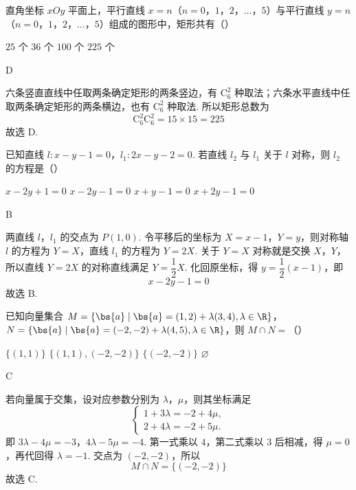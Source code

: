 \begin{problem}
直角坐标 \(xOy\) 平面上，平行直线 \(x=n\)（\(n=0\)，\(1\)，\(2\)，\(\ldots\)，\(5\)）与平行直线 \(y=n\)（\(n=0\)，\(1\)，\(2\)，\(\ldots\)，\(5\)）组成的图形中，矩形共有（\quad）

\choices
    {\(25\) 个}
    {\(36\) 个}
    {\(100\) 个}
    {\(225\) 个}
\end{problem}

\begin{answer}
D
\end{answer}

\begin{solution}
六条竖直直线中任取两条确定矩形的两条竖边，有 \(\mathrm C_6^2\) 种取法；六条水平直线中任取两条确定矩形的两条横边，也有 \(\mathrm C_6^2\) 种取法. 所以矩形总数为
\[
\mathrm C_6^2\mathrm C_6^2=15\times15=225
\]
故选 D.
\end{solution}

\begin{problem}
已知直线 \(l:x-y-1=0\)，\(l_1:2x-y-2=0\). 若直线 \(l_2\) 与 \(l_1\) 关于 \(l\) 对称，则 \(l_2\) 的方程是（\quad）

\choices
    {\(x-2y+1=0\)}
    {\(x-2y-1=0\)}
    {\(x+y-1=0\)}
    {\(x+2y-1=0\)}
\end{problem}

\begin{answer}
B
\end{answer}

\begin{solution}
两直线 \(l\)，\(l_1\) 的交点为 \(P(1,0)\). 令平移后的坐标为 \(X=x-1\)，\(Y=y\)，则对称轴 \(l\) 的方程为 \(Y=X\)，直线 \(l_1\) 的方程为 \(Y=2X\). 关于 \(Y=X\) 对称就是交换 \(X\)，\(Y\)，所以直线 \(Y=2X\) 的对称直线满足 \(Y=\dfrac12X\). 化回原坐标，得 \(y=\dfrac12(x-1)\)，即
\[
x-2y-1=0
\]
故选 B.
\end{solution}

\begin{problem}
已知向量集合 \(M=\{\bs{a}\mid \bs{a}=(1,2)+\lambda(3,4),\lambda\in\R\}\)，\(N=\{\bs{a}\mid\bs{a}=(-2,-2)+\lambda(4,5),\lambda\in\R\}\)，则 \(M\cap N=\)（\quad）

\choices
    {\(\{(1,1)\}\)}
    {\(\{(1,1),(-2,-2)\}\)}
    {\(\{(-2,-2)\}\)}
    {\(\varnothing\)}
\end{problem}

\begin{answer}
C
\end{answer}

\begin{solution}
若向量属于交集，设对应参数分别为 \(\lambda\)，\(\mu\)，则其坐标满足
\[
\begin{cases}
1+3\lambda=-2+4\mu,\\
2+4\lambda=-2+5\mu.
\end{cases}
\]
即 \(3\lambda-4\mu=-3\)，\(4\lambda-5\mu=-4\). 第一式乘以 \(4\)，第二式乘以 \(3\) 后相减，得 \(\mu=0\)，再代回得 \(\lambda=-1\). 交点为 \((-2,-2)\)，所以
\[
M\cap N=\{(-2,-2)\}
\]
故选 C.
\end{solution}

